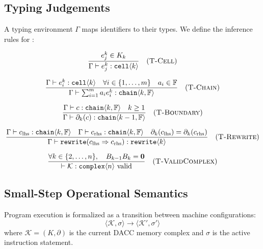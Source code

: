 \subsection{Typing Judgements}
A typing environment $\Gamma$ maps identifiers to their types. We define the inference rules for \ToposLang{}:

\begin{gather}
\frac{e_j^k \in K_k}{\Gamma \vdash e_j^k : \texttt{cell}\langle k \rangle} \quad (\textsc{T-Cell}) \\[1.5ex]
\frac{\Gamma \vdash e_i^k : \texttt{cell}\langle k \rangle \quad \forall i \in \{1,\dots,m\} \quad a_i \in \mathbb{F}}{\Gamma \vdash \sum_{i=1}^m a_i e_i^k : \texttt{chain}\langle k, \mathbb{F} \rangle} \quad (\textsc{T-Chain}) \\[1.5ex]
\frac{\Gamma \vdash c : \texttt{chain}\langle k, \mathbb{F} \rangle \quad k \ge 1}{\Gamma \vdash \partial_k(c) : \texttt{chain}\langle k-1, \mathbb{F} \rangle} \quad (\textsc{T-Boundary}) \\[1.5ex]
\frac{\Gamma \vdash c_{\text{lhs}} : \texttt{chain}\langle k, \mathbb{F} \rangle \quad \Gamma \vdash c_{\text{rhs}} : \texttt{chain}\langle k, \mathbb{F} \rangle \quad \partial_k(c_{\text{lhs}}) = \partial_k(c_{\text{rhs}})}{\Gamma \vdash \texttt{rewrite}(c_{\text{lhs}} \Rightarrow c_{\text{rhs}}) : \texttt{rewrite}\langle k \rangle} \quad (\textsc{T-Rewrite}) \\[1.5ex]
\frac{\forall k \in \{2,\dots,n\}, \quad B_{k-1} B_k = \mathbf{0}}{\vdash \mathcal{K} : \texttt{complex}\langle n \rangle \text{ valid}} \quad (\textsc{T-ValidComplex})
\end{gather}

\subsection{Small-Step Operational Semantics}
Program execution is formalized as a transition between machine configurations:
\begin{equation}
    \langle \mathcal{K}, \sigma \rangle \longrightarrow \langle \mathcal{K}', \sigma' \rangle
\end{equation}
where $\mathcal{K} = (K, \partial)$ is the current DACC memory complex and $\sigma$ is the active instruction statement.

